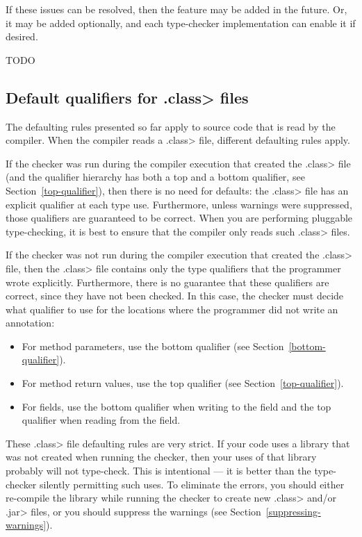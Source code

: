 If these issues can be resolved, then the feature may be added in the
future.  Or, it may be added optionally, and each type-checker
implementation can enable it if desired.


\iffalse TODO
\subsection{Default qualifiers for \<.class> files\label{defaults-classfile}}

The defaulting rules presented so far apply to source code that is read by
the compiler.  When the compiler reads a \<.class> file, different
defaulting rules apply.

If the checker was run during the compiler execution that created the
\<.class> file (and the qualifier hierarchy has both a top and a bottom
qualifier, see Section~\ref{top-qualifier}), then there is no need for
defaults:  the \<.class> file has an explicit qualifier at each type use.
Furthermore, unless warnings were suppressed, those qualifiers are
guaranteed to be correct.
When you are performing pluggable type-checking,
it is best to ensure that the compiler only reads such \<.class> files.

If the checker was not run during the compiler execution that created the
\<.class> file, then the \<.class> file contains only the type qualifiers
that the programmer wrote explicitly.  Furthermore, there is no guarantee
that these qualifiers are correct, since they have not been checked.
In this case, the checker must decide what qualifier to use for the
locations where the programmer did not write an annotation:
\begin{itemize}
\item
  For method parameters, use the bottom qualifier (see
  Section~\ref{bottom-qualifier}).
\item
  For method return values, use the top qualifier (see 
  Section~\ref{top-qualifier}).
\item
  For fields, use the bottom qualifier when writing to the field and the
  top qualifier when reading from the field.
\end{itemize}

These \<.class> file defaulting rules are very strict.  If your code uses a
library that was not created when running the checker, then your uses of
that library probably will not type-check.  This is intentional --- it is
better than the type-checker silently permitting such uses.
To eliminate the errors, you should either re-compile the library while
running the checker to create new \<.class> and/or \<.jar> files, or you
should suppress the warnings (see Section~\ref{suppressing-warnings}).

